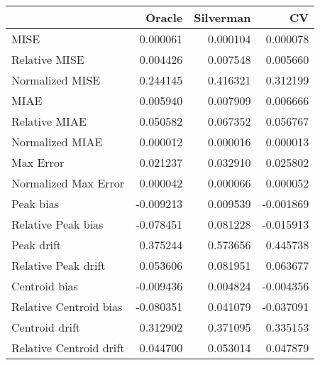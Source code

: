 \begin{tabular}{lrrr}
  \hline
 & Oracle & Silverman & CV \\ 
  \hline
MISE & 0.000061 & 0.000104 & 0.000078 \\ 
  Relative MISE & 0.004426 & 0.007548 & 0.005660 \\ 
  Normalized MISE & 0.244145 & 0.416321 & 0.312199 \\ 
  MIAE & 0.005940 & 0.007909 & 0.006666 \\ 
  Relative MIAE & 0.050582 & 0.067352 & 0.056767 \\ 
  Normalized MIAE & 0.000012 & 0.000016 & 0.000013 \\ 
  Max Error & 0.021237 & 0.032910 & 0.025802 \\ 
  Normalized Max Error & 0.000042 & 0.000066 & 0.000052 \\ 
  Peak bias & -0.009213 & 0.009539 & -0.001869 \\ 
  Relative Peak bias & -0.078451 & 0.081228 & -0.015913 \\ 
  Peak drift & 0.375244 & 0.573656 & 0.445738 \\ 
  Relative Peak drift & 0.053606 & 0.081951 & 0.063677 \\ 
  Centroid bias & -0.009436 & 0.004824 & -0.004356 \\ 
  Relative Centroid bias & -0.080351 & 0.041079 & -0.037091 \\ 
  Centroid drift & 0.312902 & 0.371095 & 0.335153 \\ 
  Relative Centroid drift & 0.044700 & 0.053014 & 0.047879 \\ 
   \hline
\end{tabular}
